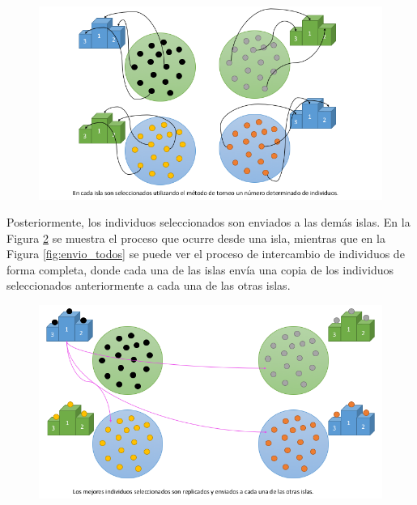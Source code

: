 \begin{figure}[H]
    \centering
    \includegraphics[width=14cm]{images/cap3/seleccion.png}
    \label{fig:seleccion}
\end{figure}

Posteriormente, los individuos seleccionados son enviados a las demás islas. En la Figura \ref{fig:envio1} se muestra el proceso que ocurre desde una isla, mientras que en la Figura \ref{fig:envio_todos} se puede ver el proceso de intercambio de individuos de forma completa, donde cada una de las islas envía una copia de los individuos seleccionados anteriormente a cada una de las otras islas.

\begin{figure}[H]
    \centering
    \includegraphics[width=14cm]{images/cap3/envio1.png}
    \label{fig:envio1}
\end{figure}

